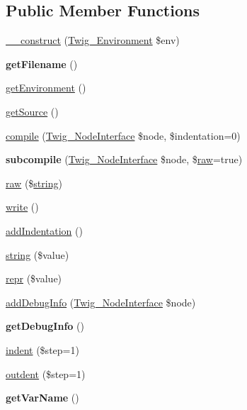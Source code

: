 \subsection*{Public Member Functions}
\begin{DoxyCompactItemize}
\item 
\hyperlink{classTwig__Compiler_ada81711edd72064fef1a3e38f157daee}{\+\_\+\+\_\+construct} (\hyperlink{classTwig__Environment}{Twig\+\_\+\+Environment} \$env)
\item 
{\bfseries get\+Filename} ()\hypertarget{classTwig__Compiler_ab55f054b8efd326bbd6d6d971300af77}{}\label{classTwig__Compiler_ab55f054b8efd326bbd6d6d971300af77}

\item 
\hyperlink{classTwig__Compiler_a44c7f561ca4c90dff84e45fd8dd67175}{get\+Environment} ()
\item 
\hyperlink{classTwig__Compiler_a51aad13f9502232ab57a2b778430c9ff}{get\+Source} ()
\item 
\hyperlink{classTwig__Compiler_a2f54b84e52b71edbcc36ad4cb01e23c2}{compile} (\hyperlink{interfaceTwig__NodeInterface}{Twig\+\_\+\+Node\+Interface} \$node, \$indentation=0)
\item 
{\bfseries subcompile} (\hyperlink{interfaceTwig__NodeInterface}{Twig\+\_\+\+Node\+Interface} \$node, \$\hyperlink{classTwig__Compiler_a123be5c17ad8ddbfae2bb9099126f8b8}{raw}=true)\hypertarget{classTwig__Compiler_aa7ff4a2cf98a6f0d0afff4ab675c3109}{}\label{classTwig__Compiler_aa7ff4a2cf98a6f0d0afff4ab675c3109}

\item 
\hyperlink{classTwig__Compiler_a123be5c17ad8ddbfae2bb9099126f8b8}{raw} (\$\hyperlink{classTwig__Compiler_a2fde861c620aecc6c638ea58400d4357}{string})
\item 
\hyperlink{classTwig__Compiler_ac8b4223ace0e3d32be120b60259ac491}{write} ()
\item 
\hyperlink{classTwig__Compiler_af9543f62b8acc590a17a99226a31b00b}{add\+Indentation} ()
\item 
\hyperlink{classTwig__Compiler_a2fde861c620aecc6c638ea58400d4357}{string} (\$value)
\item 
\hyperlink{classTwig__Compiler_af8f936d8239e94e8efefcbabb03fb9d4}{repr} (\$value)
\item 
\hyperlink{classTwig__Compiler_a26b70613b199d484fbece0f2da20a629}{add\+Debug\+Info} (\hyperlink{interfaceTwig__NodeInterface}{Twig\+\_\+\+Node\+Interface} \$node)
\item 
{\bfseries get\+Debug\+Info} ()\hypertarget{classTwig__Compiler_ac0618d3bfdf84c8d10f088a670a99e2f}{}\label{classTwig__Compiler_ac0618d3bfdf84c8d10f088a670a99e2f}

\item 
\hyperlink{classTwig__Compiler_a96bff697c3fb4b2296a23a1167cc5698}{indent} (\$step=1)
\item 
\hyperlink{classTwig__Compiler_aa3931c3c18484069b215feffc899195e}{outdent} (\$step=1)
\item 
{\bfseries get\+Var\+Name} ()\hypertarget{classTwig__Compiler_a79113a983436562c931b4e7bbdcb9309}{}\label{classTwig__Compiler_a79113a983436562c931b4e7bbdcb9309}

\end{DoxyCompactItemize}
